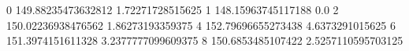 0 149.88235473632812 1.72271728515625
1 148.15963745117188 0.0
2 150.02236938476562 1.86273193359375
4 152.79696655273438 4.6373291015625
6 151.3974151611328 3.2377777099609375
8 150.6853485107422 2.5257110595703125
